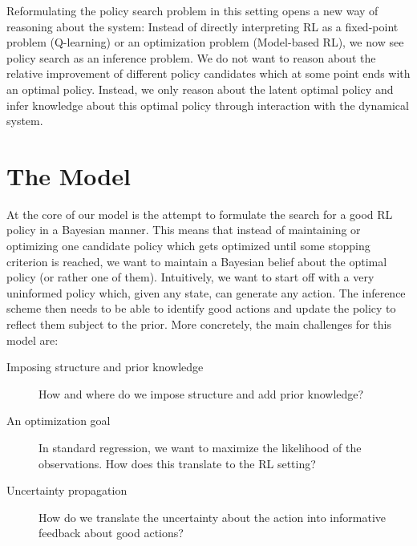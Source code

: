 Reformulating the policy search problem in this setting opens a new way of reasoning about the system:
Instead of directly interpreting RL as a fixed-point problem (Q-learning) or an optimization problem (Model-based RL), we now see policy search as an inference problem.
We do not want to reason about the relative improvement of different policy candidates which at some point ends with an optimal policy.
Instead, we only reason about the latent optimal policy and infer knowledge about this optimal policy through interaction with the dynamical system.


\section{The Model}
\label{sec:model}
At the core of our model is the attempt to formulate the search for a good RL policy in a Bayesian manner.
This means that instead of maintaining or optimizing one candidate policy which gets optimized until some stopping criterion is reached, we want to maintain a Bayesian belief about the optimal policy (or rather one of them).
Intuitively, we want to start off with a very uninformed policy which, given any state, can generate any action.
The inference scheme then needs to be able to identify good actions and update the policy to reflect them subject to the prior.
More concretely, the main challenges for this model are:
\begin{description}
    \item[Imposing structure and prior knowledge] How and where do we impose structure and add prior knowledge?
    \item[An optimization goal] In standard regression, we want to maximize the likelihood of the observations. How does this translate to the RL setting?
    \item[Uncertainty propagation] How do we translate the uncertainty about the action into informative feedback about good actions?
\end{description}


